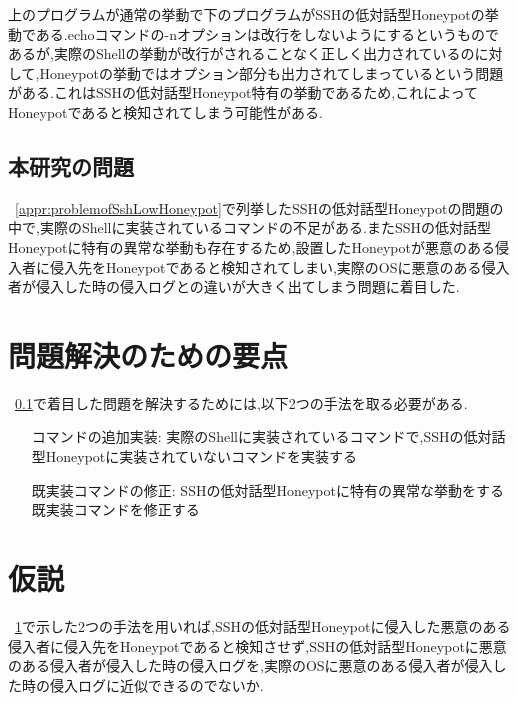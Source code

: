上のプログラムが通常の挙動で下のプログラムがSSHの低対話型Honeypotの挙動である.echoコマンドの-nオプションは改行をしないようにするというものであるが,実際のShellの挙動が改行がされることなく正しく出力されているのに対して,Honeypotの挙動ではオプション部分も出力されてしまっているという問題がある.これはSSHの低対話型Honeypot特有の挙動であるため,これによってHoneypotであると検知されてしまう可能性がある.


\subsection{本研究の問題}
\label{appr:subproblem}
~\ref{appr:problemofSshLowHoneypot}で列挙したSSHの低対話型Honeypotの問題の中で,実際のShellに実装されているコマンドの不足がある.またSSHの低対話型Honeypotに特有の異常な挙動も存在するため,設置したHoneypotが悪意のある侵入者に侵入先をHoneypotであると検知されてしまい,実際のOSに悪意のある侵入者が侵入した時の侵入ログとの違いが大きく出てしまう問題に着目した.

\section{問題解決のための要点}
\label{appr:YotenForProblem}
~\ref{appr:subproblem}で着目した問題を解決するためには,以下2つの手法を取る必要がある.

\begin{itemize}
\setlength{\leftskip}{3.2cm}
 \item[コマンドの追加実装:] 実際のShellに実装されているコマンドで,SSHの低対話型Honeypotに実装されていないコマンドを実装する
 \item[既実装コマンドの修正:] SSHの低対話型Honeypotに特有の異常な挙動をする既実装コマンドを修正する
\end{itemize}


\section{仮説}
\label{appr:Hypothesis}
~\ref{appr:YotenForProblem}で示した2つの手法を用いれば,SSHの低対話型Honeypotに侵入した悪意のある侵入者に侵入先をHoneypotであると検知させず,SSHの低対話型Honeypotに悪意のある侵入者が侵入した時の侵入ログを,実際のOSに悪意のある侵入者が侵入した時の侵入ログに近似できるのでないか.

